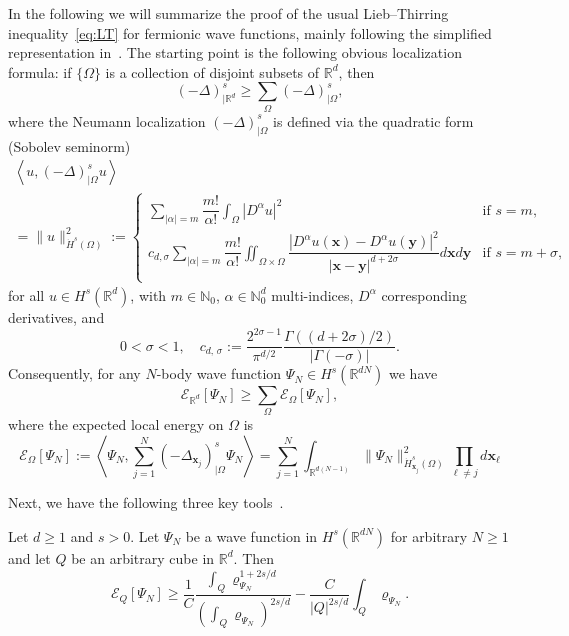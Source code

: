 \documentclass[AHL, Unicode, longabstracts, published]{cedram}
\newcommand*\N {\mathbb{N}}
\newcommand*\R {\mathbb{R}}
\newcommand\1{{\ensuremath {\mathds 1} }}
\newcommand{\bx}{\mathbf{x}}
\newcommand{\by}{\mathbf{y}}
\newcommand{\cE}{\mathcal{E}}
\begin{document}
In the following we will summarize the proof of the usual Lieb--Thirring inequality~\eqref{eq:LT} for fermionic wave functions, mainly following the simplified representation in~\cite{LunNamPor-16}. The starting point is the following obvious localization formula: if $\{\Omega\}$ is a collection of disjoint subsets of $\R^d$, then
\begin{equation}\label{eq:operator-localization}
(-\Delta)^s_{|\R^d} \ge \sum_{\Omega} (-\Delta)^s_{|\Omega},
\end{equation}
where the Neumann localization $(-\Delta)^s_{|\Omega}$ is defined via the quadratic form (Sobolev seminorm)
\begin{multline*}
\left\langle u, (-\Delta)^s_{|\Omega} u\right\rangle\\
= \|u\|_{\dot{H}^s(\Omega)}^2 := \!
\begin{cases}
\sum\limits_{|\alpha|=m} \dfrac{m!}{\alpha!} \int_{\Omega} \left|D^\alpha u\right|^2 & \text{if~}s=m, \\[0.2cm] c_{d,\sigma}\sum\limits_{|\alpha|=m} \dfrac{m!}{\alpha!} \iint_{\Omega\times \Omega} \dfrac{\left|D^\alpha u (\bx) -D^\alpha u (\by)\right|^2}{\left|\bx-\by\right|^{d+2\sigma}}d\bx d\by & \text{if~} s=m+\sigma, \\
\end{cases}
\end{multline*}
for all $u\in H^s(\R^d)$, with $m \in \N_0$, $\alpha \in \N_0^d$ multi-indices, $D^\alpha$ corresponding derivatives, and
\[
0<\sigma<1, \quad c_{d,\,\sigma} :=\frac{2^{2\sigma-1}}{\pi^{d/2}} \frac{\Gamma((d+2\sigma)/2)}{|\Gamma(-\sigma)|}.
\]
Consequently, for any $N$-body wave function $\Psi_N \in H^s(\R^{dN})$ we have
\begin{equation}\label{eq:localization}
\cE_{\R^d}[\Psi_N] \ge \sum_\Omega {\mathcal E}_\Omega[\Psi_N],
\end{equation}
where the expected local energy on $\Omega$ is
\begin{equation}\label{eq:def-EQ}
\cE_\Omega[\Psi_N] := \left\langle \Psi_N, \sum_{j=1}^N (-\Delta_{\bx_j})^s_{|\Omega} \Psi_N \right\rangle = \sum_{j=1}^N \int_{\R^{d(N-1)} } \| \Psi_N\|^2_{\dot H^s_{\bx_j}(\Omega)} \prod_{\ell \ne j} d \bx_{\ell}
\end{equation}

Next, we have the following three key tools~\cite[Lemmas~8, 11, 12]{LunNamPor-16}.

\begin{lemm}\label{lem:local-uncertainty}
Let $d\ge 1$ and $s>0$. Let $\Psi_N$ be a wave function in $H^s(\R^{dN})$ for arbitrary $N \ge 1$ and let $Q$ be an arbitrary cube in $\R^d$. Then
\begin{equation}\label{eq:local-uncertainty}
\cE_Q[\Psi_N] \ge \frac{1}{C}\frac{\int_Q \varrho_{\Psi_N}^{1+2s/d}}{\left(\int_Q \varrho_{\Psi_N} \right)^{2s/d}} - \frac{C}{|Q|^{2s/d}} \int_Q \varrho_{\Psi_N}.
\end{equation}
\end{lemm}
\end{document}
